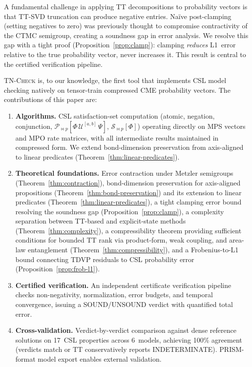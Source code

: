 \documentclass[11pt]{article}
\newcommand{\tncheck}{\textsc{TN-Check}}
\begin{document}
A fundamental challenge in applying TT decompositions to probability
vectors is that TT-SVD truncation can produce negative entries.
Na\"ive post-clamping (setting negatives to zero) was previously
thought to compromise contractivity of the CTMC semigroup, creating
a soundness gap in error analysis.
We resolve this gap with a tight proof
(Proposition~\ref{prop:clamp}): clamping \emph{reduces} L1~error
relative to the true probability vector, never increases it.
This result is central to the certified verification pipeline.

\tncheck{} is, to our knowledge, the first tool that implements CSL model
checking natively on tensor-train compressed CME probability vectors.
The contributions of this paper are:

\begin{enumerate}[leftmargin=*,itemsep=2pt]
\item \textbf{Algorithms.}
  CSL satisfaction-set computation (atomic, negation, conjunction,
  $\mathcal{P}_{\bowtie p}[\Phi\,\mathcal{U}^{[a,b]}\,\Psi]$,
  $\mathcal{S}_{\bowtie p}[\Phi]$) operating directly on MPS vectors
  and MPO rate matrices, with all intermediate results maintained in
  compressed form.
  We extend bond-dimension preservation from axis-aligned to
  linear predicates (Theorem~\ref{thm:linear-predicates}).

\item \textbf{Theoretical foundations.}
  Error contraction under Metzler semigroups (Theorem~\ref{thm:contraction}),
  bond-dimension preservation for axis-aligned propositions
  (Theorem~\ref{thm:bond-preservation}) and its extension to
  linear predicates (Theorem~\ref{thm:linear-predicates}),
  a tight clamping error bound resolving the soundness gap
  (Proposition~\ref{prop:clamp}),
  a complexity separation between TT-based and explicit-state
  methods (Theorem~\ref{thm:complexity}),
  a compressibility theorem providing sufficient conditions for
  bounded TT rank via product-form, weak coupling, and area-law
  entanglement (Theorem~\ref{thm:compressibility}),
  and a Frobenius-to-L1 bound connecting TDVP residuals to
  CSL probability error (Proposition~\ref{prop:frob-l1}).

\item \textbf{Certified verification.}
  An independent certificate verification pipeline checks
  non-negativity, normalization, error budgets, and temporal
  convergence, issuing a SOUND/UNSOUND verdict with quantified
  total error.

\item \textbf{Cross-validation.}
  Verdict-by-verdict comparison against dense reference solutions
  on 17~CSL properties across 6~models, achieving 100\% agreement
  (verdicts match or TT conservatively reports INDETERMINATE).
  PRISM-format model export enables external validation.


\end{enumerate}
\end{document}
